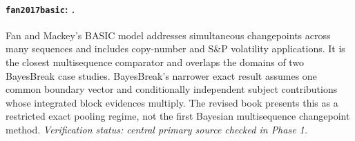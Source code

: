 
\paragraph{\texttt{fan2017basic}: \citet{fan2017basic}.}
Fan and Mackey's BASIC model addresses simultaneous changepoints across many sequences and includes copy-number and S\&P volatility applications. It is the closest multisequence comparator and overlaps the domains of two BayesBreak case studies. BayesBreak's narrower exact result assumes one common boundary vector and conditionally independent subject contributions whose integrated block evidences multiply. The revised book presents this as a restricted exact pooling regime, not the first Bayesian multisequence changepoint method. \textit{Verification status: central primary source checked in Phase 1.}
